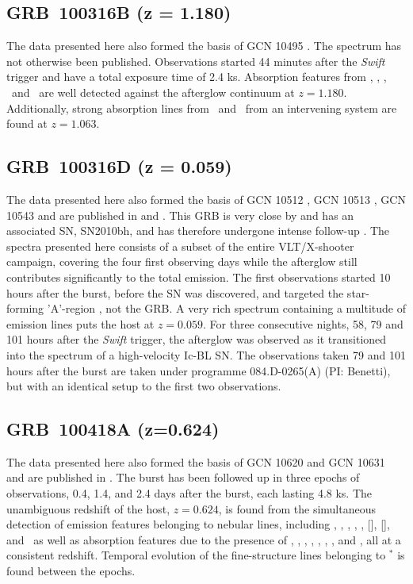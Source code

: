 \documentclass[longauth]{aa}    %
\begin{document}
\subsection{GRB~100316B (z = 1.180)} \label{100316B}

The data presented here also formed the basis of GCN 10495 \citep{GCN10495}. The
spectrum has not otherwise been published. Observations started 44 minutes after
the \textit{Swift} trigger and have a total exposure time of 2.4 ks. Absorption
features from \feii, \alii, \aliii,	\mgii~and \mgi~are well detected against the
afterglow continuum at $z = 1.180$. Additionally, strong absorption lines from
\feii~and \mgii~from an intervening system are found at $z = 1.063$.

\subsection{GRB~100316D (z = 0.059)} \label{100316D}

The data presented here also formed the basis of GCN 10512 \citep{GCN10512}, GCN
10513 \citep{GCN10513}, GCN 10543 \citep{GCN10543} and are published in
\citet{Bufano2012} and \citet{Starling2011}. This GRB is very close by and has
an associated SN, SN2010bh, and has therefore undergone intense follow-up
\citep{Olivares2011, Cano2011a, Izzo2017}. The spectra presented here consists
of a subset of the entire VLT/X-shooter campaign, covering the four first
observing days while the afterglow still contributes significantly to the total
emission. The first observations started 10 hours after the burst, before the SN
was discovered, and targeted the star-forming 'A'-region \citep{Starling2011},
not the GRB. A very rich spectrum containing a multitude of emission lines puts
the host at $z = 0.059$. For three consecutive nights, 58, 79 and 101 hours
after the \textit{Swift} trigger, the afterglow was observed as it transitioned
into the spectrum of a high-velocity Ic-BL SN. The observations taken 79 and 101
hours after the burst are taken under programme 084.D-0265(A) (PI: Benetti), but
with an identical setup to the first two observations.

\subsection{GRB~100418A (z=0.624)} \label{100418}

The data presented here also formed the basis of GCN 10620 \citep{GCN10620} and
GCN 10631 \citep{GCN10631} and are published in \citet{DeUgartePostigo2011}. The
burst has been followed up in three epochs of observations, 0.4, 1.4, and 2.4
days after the burst, each lasting 4.8 ks. The unambiguous redshift of the host,
$z=0.624$, is found from the simultaneous detection of emission features
belonging to nebular lines, including \hi, \oii, \oiii, \neiii, \nii, [\sii],
[\siii], and \hei~as well as absorption features due to the presence of \znii,
\crii, \feii, \mnii, \mgii, \mgi, \tiii, and \caii, all at a consistent
redshift. Temporal evolution of the fine-structure lines belonging to \feii$^*$
is found between the epochs.
\end{document}
